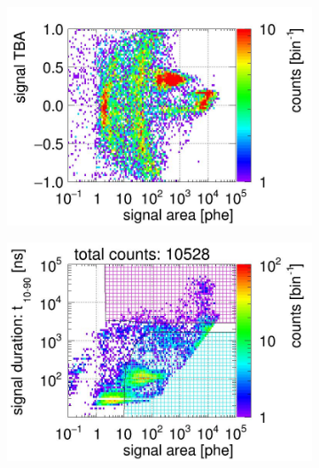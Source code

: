 \begin{landscape}
\begin{figure}[!p]
\begin{subfigure}[t]{0.32\textwidth}
			\includegraphics[width=\figurewidth,clip,trim={0 8 0 40}]{Figures/GasTest/CutsValid/res64766/tbapaX23Vecfig64766.jpg}
			\caption{}
			\label{fig:signal selection dv 10 02}
		\end{subfigure}
		\begin{subfigure}[t]{0.32\textwidth}
			\centering
			\includegraphics[width=\figurewidth,clip,trim={0 98 0 15}]{Figures/GasTest/CutsValid/res64766/pdpa26Vecfig64766.jpg}

\end{subfigure}
\end{figure}
\end{landscape}
